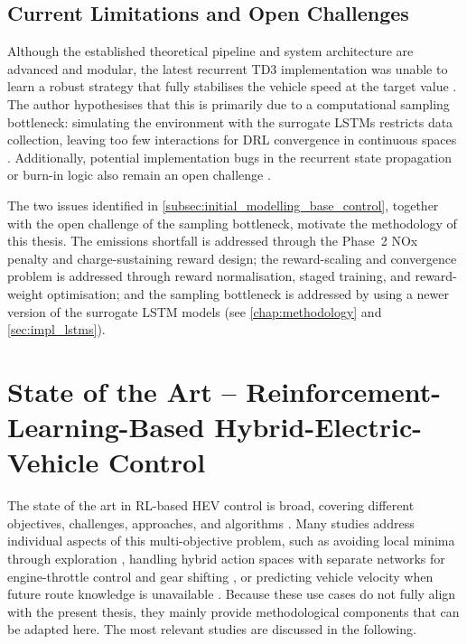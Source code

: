 \subsection{Current Limitations and Open Challenges}
\label{subsec:current_limitations}
Although the established theoretical pipeline and system architecture are advanced and modular, the latest recurrent \ac{TD3} implementation was unable to learn a robust strategy that fully stabilises the vehicle speed at the target value \cite{universitat_politecnica_de_catalunya_development_2025}. The author hypothesises that this is primarily due to a computational sampling bottleneck: simulating the environment with the surrogate \ac{LSTM}s restricts data collection, leaving too few interactions for \ac{DRL} convergence in continuous spaces \cite{universitat_politecnica_de_catalunya_development_2025}. Additionally, potential implementation bugs in the recurrent state propagation or burn-in logic also remain an open challenge \cite{universitat_politecnica_de_catalunya_development_2025}.

The two issues identified in \autoref{subsec:initial_modelling_base_control}, together with the open challenge of the sampling bottleneck, motivate the methodology of this thesis. The emissions shortfall is addressed through the Phase~2 \ac{NOx} penalty and charge-sustaining reward design; the reward-scaling and convergence problem is addressed through reward normalisation, staged training, and reward-weight optimisation; and the sampling bottleneck is addressed by using a newer version of the surrogate \ac{LSTM} models (see \autoref{chap:methodology} and \autoref{sec:impl_lstms}).

\begingroup
\renewcommand{\sectionmark}[1]{\markright{\thesection\ State of the Art -- RL-Based HEV Control}}
\section{State of the Art -- Reinforcement-Learning-Based Hybrid-Electric-Vehicle Control}
\endgroup

The state of the art in \ac{RL}-based \ac{HEV} control is broad, covering different objectives, challenges, approaches, and algorithms \cite{wang_comparative_2023,liu_intelligent_2021, liu_deep_2022}. Many studies address individual aspects of this multi-objective problem, such as avoiding local minima through exploration \cite{zhou_self-learning_2022}, handling hybrid action spaces with separate networks for engine-throttle control and gear shifting \cite{tang_double_2022}, or predicting vehicle velocity when future route knowledge is unavailable \cite{liu_reinforcement_2017}. Because these use cases do not fully align with the present thesis, they mainly provide methodological components that can be adapted here. The most relevant studies are discussed in the following.

